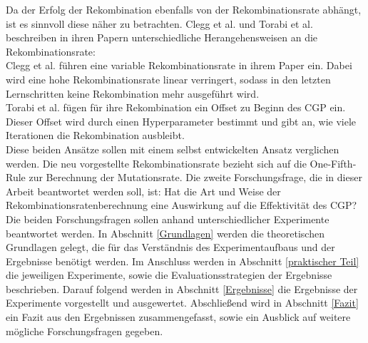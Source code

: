 Da der Erfolg der Rekombination ebenfalls von der Rekombinationsrate abhängt, ist es sinnvoll diese näher zu betrachten. 
Clegg et al. und Torabi et al. beschreiben in ihren Papern unterschiedliche Herangehensweisen an die Rekombinationsrate:\\
Clegg et al. führen eine variable Rekombinationsrate in ihrem Paper ein.
Dabei wird eine hohe Rekombinationsrate linear verringert, sodass in den letzten Lernschritten keine Rekombination mehr ausgeführt wird. \cite{clegg_new_2007}\\
Torabi et al. fügen für ihre Rekombination ein Offset zu Beginn des CGP ein. 
Dieser Offset wird durch einen Hyperparameter bestimmt und gibt an, wie viele Iterationen die Rekombination ausbleibt. \cite{torabi_using_2022}\\
Diese beiden Ansätze sollen mit einem selbst entwickelten Ansatz verglichen werden.
Die neu vorgestellte Rekombinationsrate bezieht sich auf die One-Fifth-Rule zur Berechnung der Mutationsrate.
Die zweite Forschungsfrage, die in dieser Arbeit beantwortet werden soll, ist: \glqq Hat die Art und Weise der Rekombinationsratenberechnung eine Auswirkung auf die Effektivität des CGP?\grqq\\

Die beiden Forschungsfragen sollen anhand unterschiedlicher Experimente beantwortet werden.
In Abschnitt \ref{Grundlagen} werden die theoretischen Grundlagen gelegt, die für das Verständnis des Experimentaufbaus und der Ergebnisse benötigt werden.
Im Anschluss werden in Abschnitt \ref{praktischer Teil} die jeweiligen Experimente, sowie die Evaluationsstrategien der Ergebnisse beschrieben.
Darauf folgend werden in Abschnitt \ref{Ergebnisse} die Ergebnisse der Experimente vorgestellt und ausgewertet.
Abschließend wird in Abschnitt \ref{Fazit} ein Fazit aus den Ergebnissen zusammengefasst, sowie ein Ausblick auf weitere mögliche Forschungsfragen gegeben.
